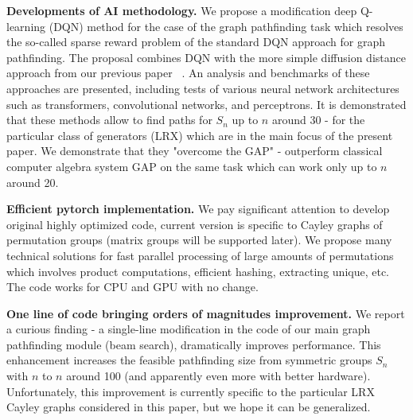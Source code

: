 \documentclass[atmp]{ipart_v1}
\numberwithin{equation}{section}
\theoremstyle{plain}%
\begin{document}
{\bf Developments of AI methodology.} We propose a modification deep Q-learning (DQN) method for the case of the graph pathfinding task which resolves  the so-called sparse reward problem of the standard DQN approach for graph pathfinding. The proposal combines DQN with the more simple diffusion distance approach from our previous paper ~\cite{chervov2025machinelearningapproachbeats}. An analysis and benchmarks of these approaches are presented, including tests of various neural network architectures such as transformers, convolutional networks, and perceptrons. It  is demonstrated that these methods allow to find paths for $S_n$ up to $n$ around 30 - for the particular class of generators (LRX) which are in the main focus of the present paper. We demonstrate that they "overcome the GAP" - outperform classical computer algebra system GAP on the same task which can work only up to $n$ around 20. 

{\bf Efficient pytorch implementation.} We pay significant attention to develop original highly optimized code, current version is specific to Cayley graphs of permutation groups (matrix groups will be supported later). We propose many technical solutions for fast parallel processing of large amounts of permutations which involves product computations, efficient hashing, extracting unique, etc. The code works for CPU and GPU with no change. 

{\bf One line of code  bringing  orders of magnitudes improvement.} We report a curious finding - a single-line modification in the code of our main graph pathfinding module (beam search), dramatically improves performance. This enhancement increases the feasible pathfinding size from symmetric groups $S_n$ with $n$ to $n$ around 100 (and apparently even more with better hardware). Unfortunately, this improvement is currently specific to the particular LRX Cayley graphs considered in this paper, but we hope it can be generalized. 

\end{document}
